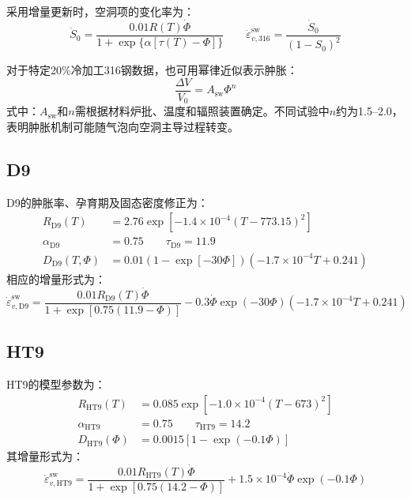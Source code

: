 采用增量更新时，空洞项的变化率为：
\begin{equation}
	\dot S_0
	=\frac{0.01R(T)\dot\varPhi}
	{1+\exp\{\alpha[\tau(T)-\varPhi]\}}
	\qquad
	\dot\varepsilon_{v,316}^{\mathrm{sw}}
	=\frac{\dot S_0}{(1-S_0)^2}
	\label{eq:appendix_ss316_swelling_rate}
\end{equation}

对于特定20\%冷加工316钢数据，也可用幂律近似表示肿胀：
\begin{equation}
	\frac{\Delta V}{V_0}=A_{\mathrm{sw}}\varPhi^n
	\label{eq:appendix_cw316_power_law_swelling}
\end{equation}
\noindent 式中：$A_{\mathrm{sw}}$和$n$需根据材料炉批、温度和辐照装置确定。不同试验中$n$约为1.5--2.0，表明肿胀机制可能随气泡向空洞主导过程转变。

\subsection{D9}

D9的肿胀率、孕育期及固态密度修正为：
\begin{equation}
	\label{eq:appendix_d9_swelling_parameters}
	\begin{aligned}
		R_{\mathrm{D9}}(T)
		&=2.76\exp[-1.4\times10^{-4}(T-773.15)^2]\\
		\alpha_{\mathrm{D9}}&=0.75
		\qquad
		\tau_{\mathrm{D9}}=11.9\\
		D_{\mathrm{D9}}(T,\varPhi)
		&=0.01(1-\exp[-30\varPhi])
		(-1.7\times10^{-4}T+0.241)
	\end{aligned}
\end{equation}
相应的增量形式为：
\begin{equation}
	\dot\varepsilon_{v,\mathrm{D9}}^{\mathrm{sw}}
	=\frac{0.01R_{\mathrm{D9}}(T)\dot\varPhi}
	{1+\exp[0.75(11.9-\varPhi)]}
	-0.3\dot\varPhi\exp(-30\varPhi)
	(-1.7\times10^{-4}T+0.241)
	\label{eq:appendix_d9_swelling_rate}
\end{equation}

\subsection{HT9}

HT9的模型参数为：
\begin{equation}
	\label{eq:appendix_ht9_swelling_parameters}
	\begin{aligned}
		R_{\mathrm{HT9}}(T)
		&=0.085\exp[-1.0\times10^{-4}(T-673)^2]\\
		\alpha_{\mathrm{HT9}}&=0.75
		\qquad
		\tau_{\mathrm{HT9}}=14.2\\
		D_{\mathrm{HT9}}(\varPhi)
		&=0.0015[1-\exp(-0.1\varPhi)]
	\end{aligned}
\end{equation}
其增量形式为：
\begin{equation}
	\dot\varepsilon_{v,\mathrm{HT9}}^{\mathrm{sw}}
	=\frac{0.01R_{\mathrm{HT9}}(T)\dot\varPhi}
	{1+\exp[0.75(14.2-\varPhi)]}
	+1.5\times10^{-4}\dot\varPhi\exp(-0.1\varPhi)
	\label{eq:appendix_ht9_swelling_rate}
\end{equation}

